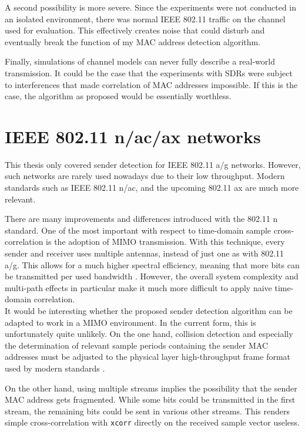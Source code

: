 A second possibility is more severe. Since the experiments were not conducted in an isolated environment, there was normal IEEE 802.11 traffic on the channel used for evaluation. This effectively creates noise that could disturb and eventually break the function of my MAC address detection algorithm.

Finally, simulations of channel models can never fully describe a real-world transmission. It could be the case that the experiments with \glspl{SDR} were subject to interferences that made correlation of MAC addresses impossible. If this is the case, the algorithm as proposed would be essentially worthless.



\section{IEEE 802.11 n/ac/ax networks}\label{sec:mimo}

This thesis only covered sender detection for IEEE 802.11 a/g networks. However, such networks are rarely used nowadays due to their low throughput. Modern standards such as IEEE 802.11 n/ac, and the upcoming 802.11 ax are much more relevant.

There are many improvements and differences introduced with the 802.11 n standard. One of the most important with respect to time-domain sample cross-correlation is the adoption of \gls{MIMO} transmission. With this technique, every sender and receiver uses multiple antennas, instead of just one as with 802.11 a/g. This allows for a much higher spectral efficiency, meaning that more bits can be transmitted per used bandwidth \cite{NEEDED}. However, the overall system complexity and multi-path effects in particular make it much more difficult to apply naive time-domain correlation.\\

It would be interesting whether the proposed sender detection algorithm can be adapted to work in a \gls{MIMO} environment. In the current form, this is unfortunately quite unlikely. On the one hand, collision detection and especially the determination of relevant sample periods containing the sender MAC addresses must be adjusted to the physical layer high-throughput frame format used by modern standards \cite{ieee2012}.

On the other hand, using multiple streams implies the possibility that the sender MAC address gets fragmented. While some bits could be transmitted in the first stream, the remaining bits could be sent in various other streams. This renders simple cross-correlation with \texttt{xcorr} directly on the received sample vector useless.


